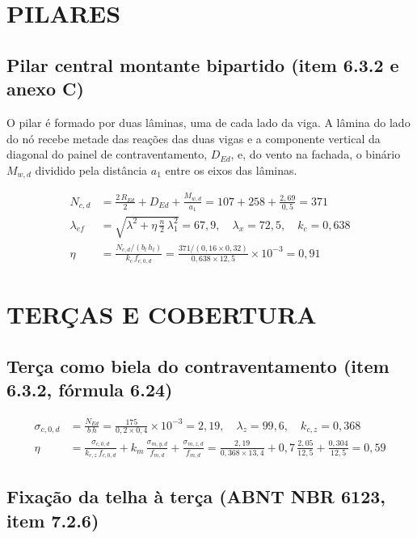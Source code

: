 \section{PILARES}\label{sec:mem-pilares}

\subsection*{Pilar central montante bipartido (item 6.3.2 e anexo C)}

O pilar é formado por duas lâminas, uma de cada lado da viga. A lâmina do lado do nó recebe metade das reações das duas vigas e a componente vertical da diagonal do painel de contraventamento, $D_{Ed}$, e, do vento na fachada, o binário $M_{w,d}$ dividido pela distância $a_1$ entre os eixos das lâminas.

\begin{align}
    N_{c,d} &= \frac{2\,R_{Ed}}{2} + D_{Ed} + \frac{M_{w,d}}{a_1} = 107 + 258 + \frac{2{,}69}{0{,}5} = 371 \nonumber \\
    \lambda_{ef} &= \sqrt{\lambda^2 + \eta\,\frac{n}{2}\,\lambda_1^2} = 67{,}9,\quad \lambda_x = 72{,}5,\quad k_c = 0{,}638 \nonumber \\
    \eta &= \frac{N_{c,d}/(b_l\,h_l)}{k_c\,f_{c,0,d}} = \frac{371 / (0{,}16 \times 0{,}32)}{0{,}638 \times 12{,}5} \times 10^{-3} = 0{,}91
    \label{eq:mem-pilar-central}
\end{align}
\section{TERÇAS E COBERTURA}\label{sec:mem-tercas}

\subsection*{Terça como biela do contraventamento (item 6.3.2, fórmula 6.24)}

\begin{align}
    \sigma_{c,0,d} &= \frac{N_{Ed}}{b\,h} = \frac{175}{0{,}2 \times 0{,}4} \times 10^{-3} = 2{,}19,\quad \lambda_z = 99{,}6,\quad k_{c,z} = 0{,}368 \nonumber \\
    \eta &= \frac{\sigma_{c,0,d}}{k_{c,z}\,f_{c,0,d}} + k_m\,\frac{\sigma_{m,y,d}}{f_{m,d}} + \frac{\sigma_{m,z,d}}{f_{m,d}} = \frac{2{,}19}{0{,}368 \times 13{,}4} + 0{,}7\,\frac{2{,}05}{12{,}5} + \frac{0{,}304}{12{,}5} = 0{,}59
    \label{eq:mem-terca}
\end{align}
\subsection*{Fixação da telha à terça (ABNT NBR 6123, item 7.2.6)}

